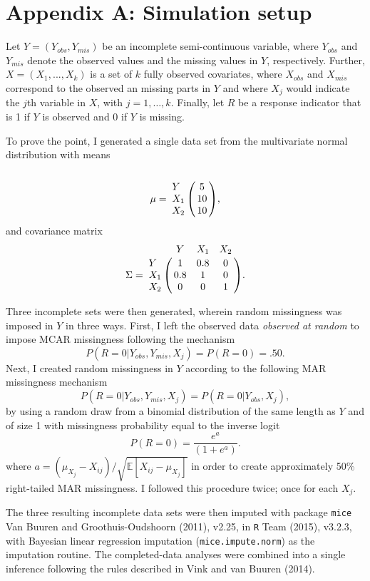 \documentclass[
]{article}
\begin{document}
\hypertarget{appendix-a-simulation-setup}{%
\section{Appendix A: Simulation
setup}\label{appendix-a-simulation-setup}}

Let \(Y=(Y_{obs},Y_{mis})\) be an incomplete semi-continuous variable,
where \(Y_{obs}\) and \(Y_{mis}\) denote the observed values and the
missing values in \(Y\), respectively. Further, \(X=(X_1,...,X_k)\) is a
set of \(k\) fully observed covariates, where \(X_{obs}\) and
\(X_{mis}\) correspond to the observed an missing parts in \(Y\) and
where \(X_j\) would indicate the \(j\)th variable in \(X\), with
\(j=1,\dots, k\). Finally, let \(R\) be a response indicator that is 1
if \(Y\) is observed and 0 if \(Y\) is missing.

To prove the point, I generated a single data set from the multivariate
normal distribution with means \[
\mu= \bordermatrix{&     \cr
 Y  &5  \cr
{ X}_1  &10 \cr
{ X}_2  &10 },
\] and covariance matrix \[
\Sigma = \bordermatrix{& Y &{ X}_1 &{ X}_2   \cr
 Y  &1  &0.8    &0\cr
{ X}_1  &0.8    &1  &0\cr
{ X}_2  &0  &0  &1}.
\]

Three incomplete sets were then generated, wherein random missingness
was imposed in \(Y\) in three ways. First, I left the observed data
\emph{observed at random} to impose MCAR missingness following the
mechanism \[
P(R=0|Y_{obs},Y_{mis}, X_j)=P(R=0)=.50.
\] Next, I created random missingness in \(Y\) according to the
following MAR missingness mechanism \[
P(R=0|Y_{obs},Y_{mis}, X_j)=P(R=0|Y_{obs}, X_j),
\] by using a random draw from a binomial distribution of the same
length as \(Y\) and of size 1 with missingness probability equal to the
inverse logit \[
P(R=0)=\frac{e^{a}}{(1+e^{a})}.
\] where \(a=(\mu_{X_j}-X_{ij})/\sqrt{\mathbb{E}[X_{ij} - \mu_{X_j}]}\)
in order to create approximately 50\% right-tailed MAR missingness. I
followed this procedure twice; once for each \(X_j\).

The three resulting incomplete data sets were then imputed with package
\texttt{mice} Van Buuren and Groothuis-Oudshoorn (2011), v2.25, in
\texttt{R} Team (2015), v3.2.3, with Bayesian linear regression
imputation (\texttt{mice.impute.norm}) as the imputation routine. The
completed-data analyses were combined into a single inference following
the rules described in Vink and van Buuren (2014).
\end{document}

